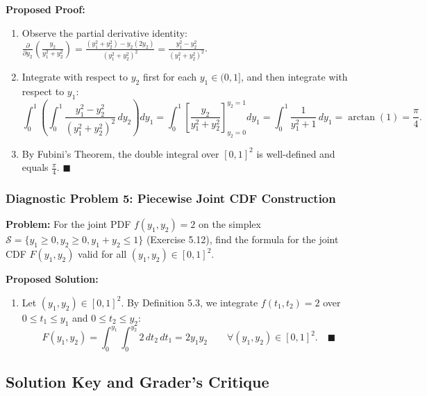 \documentclass[11pt, letterpaper]{article}
\theoremstyle{definition}
\theoremstyle{remark}
\begin{document}
\textbf{Proposed Proof:}
\begin{enumerate}[label=\textbf{Step \arabic*:}]
    \item Observe the partial derivative identity: $\frac{\partial}{\partial y_2}\!\left( \frac{y_2}{y_1^2 + y_2^2} \right) = \frac{(y_1^2 + y_2^2) - y_2(2y_2)}{(y_1^2 + y_2^2)^2} = \frac{y_1^2 - y_2^2}{(y_1^2 + y_2^2)^2}$.
    \item Integrate with respect to $y_2$ first for each $y_1 \in (0, 1]$, and then integrate with respect to $y_1$:
    \[
        \int_{0}^{1} \left( \int_{0}^{1} \frac{y_1^2 - y_2^2}{(y_1^2 + y_2^2)^2} \, dy_2 \right) dy_1 = \int_{0}^{1} \left[ \frac{y_2}{y_1^2 + y_2^2} \right]_{y_2=0}^{y_2=1} dy_1 = \int_{0}^{1} \frac{1}{y_1^2 + 1} \, dy_1 = \arctan(1) = \frac{\pi}{4}.
    \]
    \item By Fubini's Theorem, the double integral over $[0, 1]^2$ is well-defined and equals $\frac{\pi}{4}$. $\blacksquare$
\end{enumerate}

\bigskip

\subsubsection*{Diagnostic Problem 5: Piecewise Joint CDF Construction}
\textbf{Problem:} For the joint PDF $f(y_1, y_2) = 2$ on the simplex $\mathcal{S} = \{y_1 \ge 0, y_2 \ge 0, y_1 + y_2 \le 1\}$ (Exercise 5.12), find the formula for the joint CDF $F(y_1, y_2)$ valid for all $(y_1, y_2) \in [0, 1]^2$.

\textbf{Proposed Solution:}
\begin{enumerate}[label=\textbf{Step \arabic*:}]
    \item Let $(y_1, y_2) \in [0, 1]^2$. By Definition 5.3, we integrate $f(t_1, t_2) = 2$ over $0 \le t_1 \le y_1$ and $0 \le t_2 \le y_2$:
    \[
        F(y_1, y_2) = \int_{0}^{y_1} \int_{0}^{y_2} 2 \, dt_2 \, dt_1 = 2 y_1 y_2 \qquad \forall (y_1, y_2) \in [0, 1]^2. \quad \blacksquare
    \]
\end{enumerate}

\newpage

\subsection{Solution Key and Grader's Critique}
\end{document}
